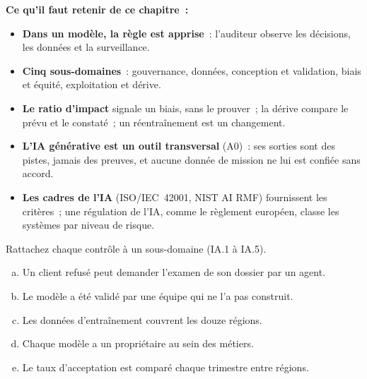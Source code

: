 
\separateur

\begin{boxresume}
\textbf{Ce qu'il faut retenir de ce chapitre~:}
\begin{itemize}
    \item \textbf{Dans un modèle, la règle est apprise}~: l'auditeur observe
          les décisions, les données et la surveillance.
    \item \textbf{Cinq sous-domaines}~: gouvernance, données, conception et
          validation, biais et équité, exploitation et dérive.
    \item \textbf{Le ratio d'impact} signale un biais, sans le prouver~; la
          dérive compare le prévu et le constaté~; un réentraînement est un
          changement.
    \item \textbf{L'IA générative est un outil transversal} (A0)~: ses
          sorties sont des pistes, jamais des preuves, et aucune donnée de
          mission ne lui est confiée sans accord.
    \item \textbf{Les cadres de l'IA} (ISO/IEC~42001, NIST AI RMF)
          fournissent les critères~; une régulation de l'IA, comme le
          règlement européen, classe les systèmes par niveau de risque.
\end{itemize}
\end{boxresume}

\bigskip

\begin{boxexo}[title={\ding{45}\quad Exercice~28.1. Rattacher les contrôles \niveaubase}]
Rattachez chaque contrôle à un sous-domaine (IA.1 à IA.5).
\begin{enumerate}[(a)]
    \item Un client refusé peut demander l'examen de son dossier par un
          agent.
    \item Le modèle a été validé par une équipe qui ne l'a pas construit.
    \item Les données d'entraînement couvrent les douze régions.
    \item Chaque modèle a un propriétaire au sein des métiers.
    \item Le taux d'acceptation est comparé chaque trimestre entre régions.
\end{enumerate}
\end{boxexo}

